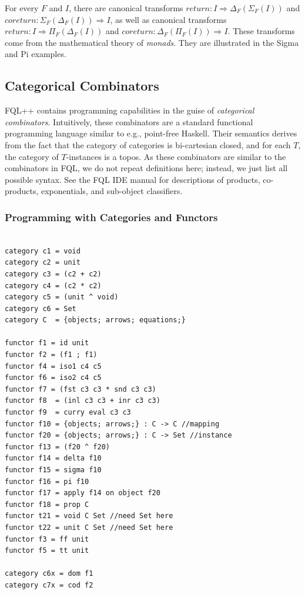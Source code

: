 \documentclass[12pt]{article}
\begin{document}
For every $F$ and $I$, there are canonical transforms $return : I \Rightarrow \Delta_F(\Sigma_F(I))$ and $coreturn : \Sigma_F(\Delta_F(I)) \Rightarrow I$, as well as canonical transforms $return : I \Rightarrow \Pi_F(\Delta_F(I))$ and $coreturn : \Delta_F(\Pi_F(I)) \Rightarrow I$.  These transforms come from the mathematical theory of {\it monads}.  They are illustrated in the Sigma and Pi examples.

\subsection{Categorical Combinators}

FQL++ contains programming capabilities in the guise of {\it categorical combinators}.  Intuitively, these combinators are a standard functional programming language similar to e.g., point-free Haskell. Their semantics derives from the fact that the category of categories  is bi-cartesian closed, and for each $T$, the category of $T$-instances is a topos.  As these combinators are similar to the combinators in FQL, we do not repeat definitions here; instead, we just list all possible syntax.  See the FQL IDE manual for descriptions of products, co-products, exponentials, and sub-object classifiers.

\subsubsection{Programming with Categories and Functors}

\begin{verbatim}

category c1 = void
category c2 = unit
category c3 = (c2 + c2)
category c4 = (c2 * c2)
category c5 = (unit ^ void)
category c6 = Set
category C  = {objects; arrows; equations;}

functor f1 = id unit
functor f2 = (f1 ; f1)
functor f4 = iso1 c4 c5
functor f6 = iso2 c4 c5
functor f7 = (fst c3 c3 * snd c3 c3) 
functor f8  = (inl c3 c3 + inr c3 c3) 
functor f9  = curry eval c3 c3 
functor f10 = {objects; arrows;} : C -> C //mapping
functor f20 = {objects; arrows;} : C -> Set //instance
functor f13 = (f20 ^ f20) 
functor f14 = delta f10
functor f15 = sigma f10
functor f16 = pi f10
functor f17 = apply f14 on object f20
functor f18 = prop C
functor t21 = void C Set //need Set here
functor t22 = unit C Set //need Set here
functor f3 = ff unit
functor f5 = tt unit

category c6x = dom f1
category c7x = cod f2
\end{verbatim}
\end{document}
